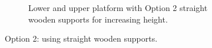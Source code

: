 {\begin{figure}[htb]
\begin{subfigure}{.45\textwidth}
    \caption{Lower and upper platform with Option 2 straight wooden supports
             for increasing height.}
    \label{fig:parkour-option2-full}
  \end{subfigure}
  \caption{Option 2: using straight wooden supports.}
\end{figure}

}